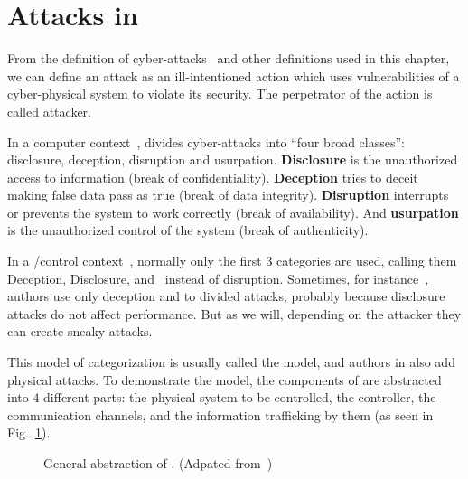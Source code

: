 \documentclass[../main.tex]{subfiles}
\begin{document}
\section{Attacks in \cps{}}\label{sec:attacks}

From the definition of cyber-attacks~\cite{Bishop2005} and other
definitions used in this chapter, we can define an attack as an ill-intentioned action which uses vulnerabilities of a cyber-physical system to violate its security.
The perpetrator of the action is called attacker.

In a computer context~\cite{Bishop2005},  divides cyber-attacks into ``four broad classes'':
disclosure, deception, disruption and usurpation.
\textbf{Disclosure} is the unauthorized access to information (break of confidentiality).
\textbf{Deception} tries to deceit making false data pass as true (break of data integrity).
\textbf{Disruption} interrupts or prevents the system to work correctly (break of availability). And \textbf{usurpation} is the unauthorized control of the system (break of authenticity).

In a \cps{}/control context~\cite{CardenasEtAl2008}, normally only the first 3 categories are used, calling them Deception, Disclosure, and~\DoS{} instead of disruption.
Sometimes, for instance~\cite{AminEtAl2009}, authors use only deception and \DoS{} to divided attacks, probably because disclosure attacks do not affect performance. But as we will, depending on the attacker they can create sneaky attacks.

This model of categorization is usually called the \DDD{} model, and authors in \cps{} also add physical attacks. To demonstrate the \DDD{} model, the components of
\cps{} are abstracted into 4 different parts: the physical system to be controlled, the controller, the communication channels, and the information trafficking by them  (as seen in Fig.~\ref{fig:cps_abstraction}).

\begin{figure}[h]
  \centering
\caption{General abstraction of \cps{}. (Adpated from~\cite{CardenasEtAl2008,AminEtAl2009})}\label{fig:cps_abstraction}
\end{figure}
\end{document}
